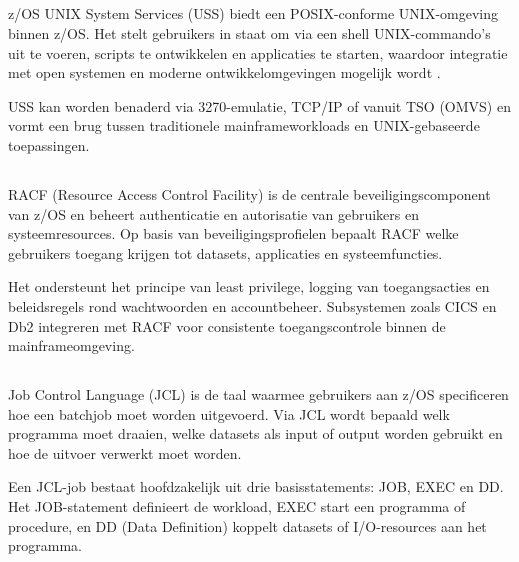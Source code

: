 \subsection{}
\label{sec:z-os-unix-system-services}

z/OS UNIX System Services (USS) biedt een POSIX-conforme UNIX-omgeving binnen z/OS. Het stelt gebruikers in staat om via een shell UNIX-commando’s uit te voeren, scripts te ontwikkelen en applicaties te starten, waardoor integratie met open systemen en moderne ontwikkelomgevingen mogelijk wordt \autocite{IBM_zOS_Concepts}.

USS kan worden benaderd via 3270-emulatie, TCP/IP of vanuit TSO (OMVS) en vormt een brug tussen traditionele mainframeworkloads en UNIX-gebaseerde toepassingen.

\subsection{}
\label{sec:network-and-security}

RACF (Resource Access Control Facility) is de centrale beveiligingscomponent van z/OS en beheert authenticatie en autorisatie van gebruikers en systeemresources. Op basis van beveiligingsprofielen bepaalt RACF welke gebruikers toegang krijgen tot datasets, applicaties en systeemfuncties. \autocite{IBM_zOS_Concepts}

Het ondersteunt het principe van least privilege, logging van toegangsacties en beleidsregels rond wachtwoorden en accountbeheer. Subsystemen zoals CICS en Db2 integreren met RACF voor consistente toegangscontrole binnen de mainframeomgeving. \autocite{IBM_zOS_Concepts}

\subsection{}
\label{sec:jcl}

Job Control Language (JCL) is de taal waarmee gebruikers aan z/OS specificeren hoe een batchjob moet worden uitgevoerd. Via JCL wordt bepaald welk programma moet draaien, welke datasets als input of output worden gebruikt en hoe de uitvoer verwerkt moet worden. \autocite{IBM_zOS_Concepts}

Een JCL-job bestaat hoofdzakelijk uit drie basisstatements: JOB, EXEC en DD. Het JOB-statement definieert de workload, EXEC start een programma of procedure, en DD (Data Definition) koppelt datasets of I/O-resources aan het programma. \autocite{IBM_zOS_Concepts}

